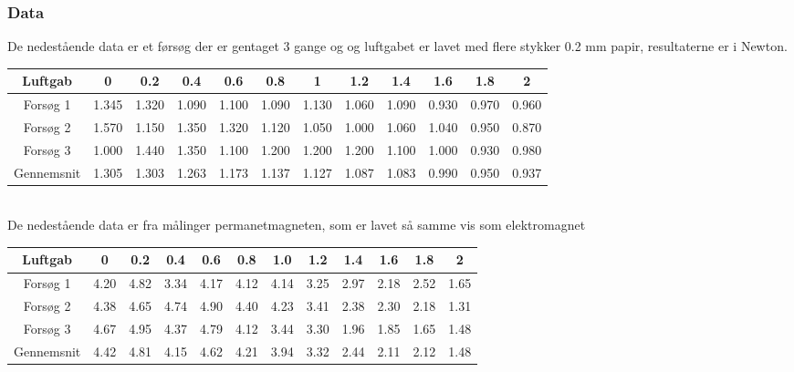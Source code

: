 \subsubsection*{Data}
De nedestående data er et førsøg der er gentaget 3 gange og og luftgabet er lavet med flere stykker 0.2 mm papir, resultaterne er i Newton. \\

\begin{tabular}{|c|c|c|c|c|c|c|c|c|c|c|c|}
\hline 
Luftgab & 0 & 0.2 & 0.4 & 0.6 & 0.8 & 1 & 1.2 & 1.4 & 1.6 & 1.8 & 2 \\ 
\hline 
Forsøg 1 & 1.345 & 1.320 & 1.090 & 1.100 & 1.090 & 1.130 & 1.060 & 1.090 & 0.930 & 0.970 & 0.960 \\ 
\hline 
Forsøg 2 & 1.570 & 1.150 & 1.350 & 1.320 & 1.120 & 1.050 & 1.000 & 1.060 & 1.040 & 0.950 & 0.870 \\ 
\hline 
Forsøg 3 & 1.000 & 1.440 & 1.350 & 1.100 & 1.200 & 1.200 & 1.200 & 1.100 & 1.000 & 0.930 & 0.980 \\ 
\hline 
Gennemsnit & 1.305 & 1.303 & 1.263 & 1.173 & 1.137 & 1.127 & 1.087 & 1.083 & 0.990 & 0.950 & 0.937 \\ 
\hline 
\end{tabular}
\\
De nedestående data er fra målinger permanetmagneten, som er lavet så samme vis som elektromagnet\\

\begin{tabular}{|c|c|c|c|c|c|c|c|c|c|c|c|}
\hline
Luftgab & 0 & 0.2 & 0.4 & 0.6 & 0.8 & 1.0 & 1.2 & 1.4 & 1.6 & 1.8 & 2 \\
\hline
Forsøg 1 & 4.20 & 4.82 & 3.34 & 4.17 & 4.12 & 4.14 & 3.25 & 2.97 & 2.18 & 2.52 & 1.65 \\
\hline
Forsøg 2 & 4.38 & 4.65 & 4.74 & 4.90 & 4.40 & 4.23 & 3.41 & 2.38 & 2.30 & 2.18 & 1.31 \\
\hline
Forsøg 3 & 4.67 & 4.95 & 4.37 & 4.79 & 4.12 & 3.44 & 3.30 & 1.96 & 1.85 & 1.65 & 1.48 \\
\hline 
Gennemsnit & 4.42 & 4.81 & 4.15 & 4.62 & 4.21 & 3.94 & 3.32 & 2.44 & 2.11 & 2.12 & 1.48 \\
\hline
\end{tabular} 


